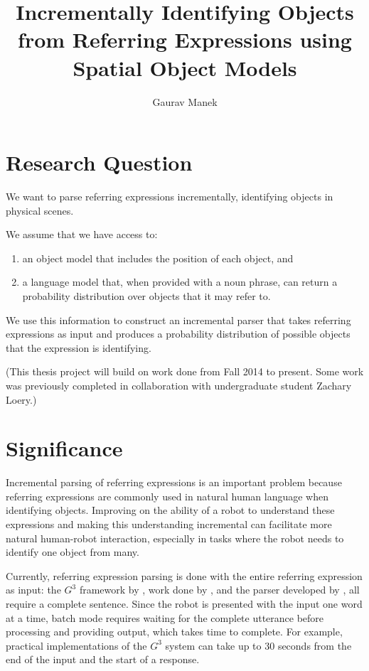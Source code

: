 \documentclass[letterpaper,10pt]{article}
\title{Incrementally Identifying Objects from Referring Expressions using Spatial Object Models}
\author{Gaurav Manek}
\begin{document}
\maketitle


\section{Research Question}

We want to parse referring expressions incrementally,  identifying objects in physical scenes.

We assume that we have access to:
\begin{enumerate}[topsep=0pt,itemsep=-1ex,partopsep=1ex,parsep=1ex]
 \item an object model that includes the position of each object, and
 \item a language model that, when provided with a noun phrase, can return a probability distribution over objects that it may refer to.
\end{enumerate}

We use this information to construct an incremental parser that takes referring expressions as input and produces a probability distribution of possible objects that the expression is identifying.

(This thesis project will build on work done from Fall 2014 to present. Some work was previously completed in collaboration with undergraduate student Zachary Loery.)

\section{Significance}

Incremental parsing of referring expressions is an important problem because referring expressions are commonly used in natural human language when identifying objects. Improving on the ability of a robot to understand these expressions and making this understanding incremental can facilitate more natural human-robot interaction, especially in tasks where the robot needs to identify one object from many.

Currently, referring expression parsing is done with the entire referring expression as input: the $G^3$ framework by \citet{tellex2011understanding}, work done by \citet{UW_RSE_ICML2012}, and the parser developed by \citet{artzi2013weakly}, all require a complete sentence. Since the robot is presented with the input one word at a time, batch mode requires waiting for the complete utterance before processing and providing output, which takes time to complete. For example, practical implementations of the $G^3$ system can take up to 30 seconds from the end of the input and the start of a response. 
\end{document}
